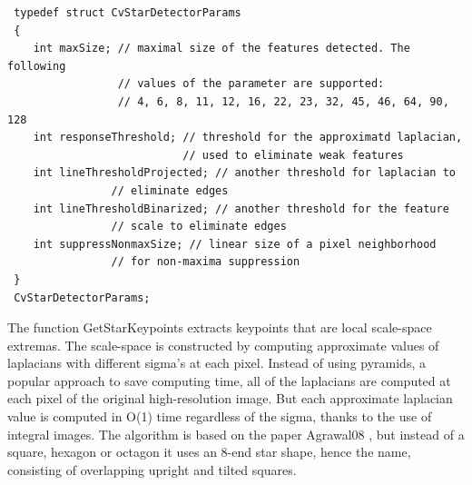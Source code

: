 \begin{description}
\ifC
{}
\begin{lstlisting}
 typedef struct CvStarDetectorParams
 {
    int maxSize; // maximal size of the features detected. The following 
                 // values of the parameter are supported:
                 // 4, 6, 8, 11, 12, 16, 22, 23, 32, 45, 46, 64, 90, 128
    int responseThreshold; // threshold for the approximatd laplacian,
                           // used to eliminate weak features
    int lineThresholdProjected; // another threshold for laplacian to 
                // eliminate edges
    int lineThresholdBinarized; // another threshold for the feature 
                // scale to eliminate edges
    int suppressNonmaxSize; // linear size of a pixel neighborhood 
                // for non-maxima suppression
 }
 CvStarDetectorParams;
\end{lstlisting}
\else
{}
\fi
\end{description}

The function GetStarKeypoints extracts keypoints that are local
scale-space extremas. The scale-space is constructed by computing
approximate values of laplacians with different sigma's at each
pixel. Instead of using pyramids, a popular approach to save computing
time, all of the laplacians are computed at each pixel of the original
high-resolution image. But each approximate laplacian value is computed
in O(1) time regardless of the sigma, thanks to the use of integral
images. The algorithm is based on the paper 
Agrawal08
, but instead
of a square, hexagon or octagon it uses an 8-end star shape, hence the name,
consisting of overlapping upright and tilted squares.

